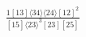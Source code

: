 \documentclass[varwidth, border=5pt]{standalone}
\begin{document}
\begin{my}
$\begin{gathered}
\scriptscriptstyle\frac{1[13]⟨34⟩⟨24⟩[12]^2}{[15]⟨23⟩^3[23][25]}
\end{gathered}$
\end{my}
\end{document}
